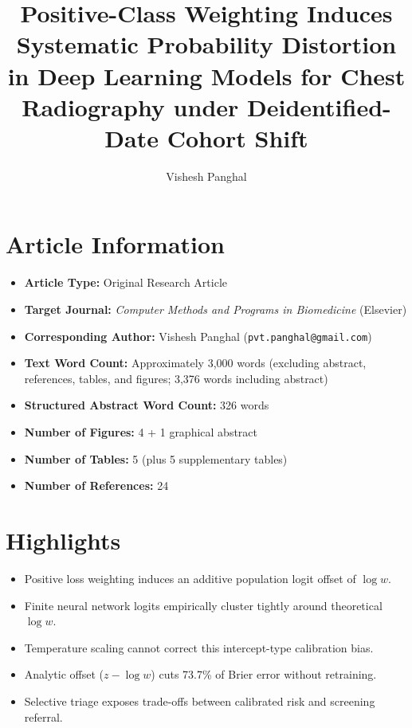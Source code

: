 \documentclass[preprint,12pt]{elsarticle}
\begin{document}
\begin{frontmatter}

\title{Positive-Class Weighting Induces Systematic Probability Distortion in Deep Learning Models for Chest Radiography under Deidentified-Date Cohort Shift}

\author{Vishesh Panghal}


\end{frontmatter}

\section*{Article Information}
\begin{itemize}
    \item \textbf{Article Type:} Original Research Article
    \item \textbf{Target Journal:} \textit{Computer Methods and Programs in Biomedicine} (Elsevier)
    \item \textbf{Corresponding Author:} Vishesh Panghal (\texttt{pvt.panghal@gmail.com})
    \item \textbf{Text Word Count:} Approximately 3,000 words (excluding abstract, references, tables, and figures; 3,376 words including abstract)
    \item \textbf{Structured Abstract Word Count:} 326 words
    \item \textbf{Number of Figures:} 4 + 1 graphical abstract
    \item \textbf{Number of Tables:} 5 (plus 5 supplementary tables)
    \item \textbf{Number of References:} 24
\end{itemize}

\section*{Highlights}
\begin{itemize}
    \item Positive loss weighting induces an additive population logit offset of $\log w$.
    \item Finite neural network logits empirically cluster tightly around theoretical $\log w$.
    \item Temperature scaling cannot correct this intercept-type calibration bias.
    \item Analytic offset ($z - \log w$) cuts 73.7\% of Brier error without retraining.
    \item Selective triage exposes trade-offs between calibrated risk and screening referral.
\end{itemize}
\end{document}

